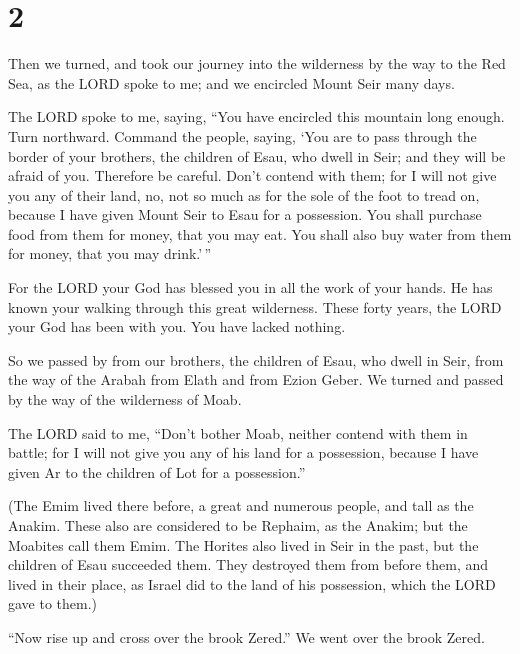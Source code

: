 \hypertarget{section-1}{%
\section{2}\label{section-1}}

 Then we turned, and took our journey into the wilderness
by the way to the Red Sea, as the LORD spoke to me; and we encircled
Mount Seir many days.

 The LORD spoke to me, saying,  ``You have
encircled this mountain long enough. Turn northward. 
Command the people, saying, `You are to pass through the border of your
brothers, the children of Esau, who dwell in Seir; and they will be
afraid of you. Therefore be careful.  Don't contend with
them; for I will not give you any of their land, no, not so much as for
the sole of the foot to tread on, because I have given Mount Seir to
Esau for a possession.  You shall purchase food from them
for money, that you may eat. You shall also buy water from them for
money, that you may drink.'\,''

 For the LORD your God has blessed you in all the work of
your hands. He has known your walking through this great wilderness.
These forty years, the LORD your God has been with you. You have lacked
nothing.

 So we passed by from our brothers, the children of Esau,
who dwell in Seir, from the way of the Arabah from Elath and from Ezion
Geber. We turned and passed by the way of the wilderness of Moab.

 The LORD said to me, ``Don't bother Moab, neither contend
with them in battle; for I will not give you any of his land for a
possession, because I have given Ar to the children of Lot for a
possession.''

 (The Emim lived there before, a great and numerous
people, and tall as the Anakim.  These also are
considered to be Rephaim, as the Anakim; but the Moabites call them
Emim.  The Horites also lived in Seir in the past, but
the children of Esau succeeded them. They destroyed them from before
them, and lived in their place, as Israel did to the land of his
possession, which the LORD gave to them.)

 ``Now rise up and cross over the brook Zered.'' We went
over the brook Zered.


